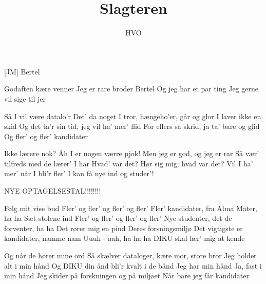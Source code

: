 \documentclass[a4paper,11pt]{article}
\title{Slagteren}
\author{HVO}
\begin{document}
\maketitle

\begin{roles}
[JM] Bertel
\end{roles}

\begin{song}

 Godaften kære venner
  Jeg er rare broder Bertel
  Og jeg har et par ting
  Jeg gerne vil sige til jer

 Så I vil være datalo'r
  Det' da noget I tror, hængeho'er, går og glor
  I laver ikke en skid
  Og det ta'r sin tid, jeg vil ha' mer' flid
  For ellers så skrid, ja ta' bare og glid
  Og fler' og fler' kandidater

 Ikke lærere nok?  Åh I er nogen værre pjok!
  Men jeg er god, og jeg er rar
  Så vær' tilfreds med de lærer' I har
  Hvad' var det? Hør sig mig; hvad var det?
  Vil I ha' mer' når I bli'r fler'
  I kan få nye ind og studer'!
  
  NYE OPTAGELSESTAL!!!!!!!!

 Følg mit vise bud
  Fler' og fler' og fler' og fler'
  Fler' kandidater, fra Alma Mater, ha ha
  Sæt stolene ind
  Fler' og fler' og fler' og fler'
  Nye studenter, det de forventer, ha ha
  Det rører mig en pind
  Deres forsningsmiljø
  Det vigtigste er kandidater, namme nam
  Uuuh - aah, ha ha ha
  DIKU skal lær' mig at kende

 Og når de hører mine ord
  Så skælver dataloger, kære mor, store bror
  Jeg holder alt i min hånd
  Og DIKU din ånd bli'r kvalt i de bånd
  Jeg har min hånd
  Ja, fast i min hånd
  Jeg skider på forskningen og på miljøet
  Når bare jeg får kandidater

\end{song}
\end{document}
